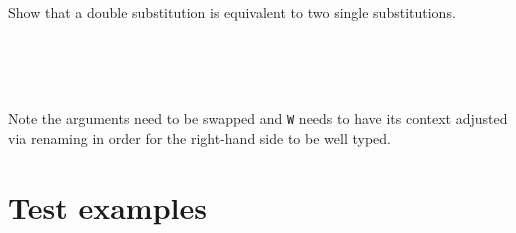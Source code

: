 Show that a double substitution is equivalent to two single
substitutions.

\begin{fence}
\begin{code}%
\>[0]\<%
\\
\>[0][@{}l@{\AgdaIndent{0}}]%
\>[2]\AgdaSpace{}%
\AgdaSymbol{:}\<%
\\
\>[2][@{}l@{\AgdaIndent{0}}]%
\>[4]%
\>[2326I]\AgdaSymbol{\{}\AgdaSpace{}%
\AgdaSpace{}%
\AgdaSpace{}%
\AgdaSymbol{\}}\AgdaSpace{}%
\AgdaSymbol{\{}\AgdaSpace{}%
\AgdaSymbol{:}\AgdaSpace{}%
\AgdaSpace{}%
\AgdaSpace{}%
\AgdaSymbol{\}}\AgdaSpace{}%
\AgdaSymbol{\{}\AgdaSpace{}%
\AgdaSymbol{:}\AgdaSpace{}%
\AgdaSpace{}%
\AgdaSpace{}%
\AgdaSymbol{\}}\AgdaSpace{}%
\AgdaSymbol{\{}\AgdaSpace{}%
\AgdaSymbol{:}\AgdaSpace{}%
\AgdaSpace{}%
\AgdaOperator{\AgdaInductiveConstructor{,}}\AgdaSpace{}%
\AgdaSpace{}%
\AgdaOperator{\AgdaInductiveConstructor{,}}\AgdaSpace{}%
\AgdaSpace{}%
\AgdaSpace{}%
\AgdaSymbol{\}}\AgdaSpace{}%
\<%
\\
\>[.][@{}l@{}]\<[2326I]%
\>[6]\AgdaSpace{}%
\AgdaOperator{\AgdaFunction{[}}\AgdaSpace{}%
\AgdaSpace{}%
\AgdaOperator{\AgdaFunction{][}}\AgdaSpace{}%
\AgdaSpace{}%
\AgdaOperator{\AgdaFunction{]}}\AgdaSpace{}%
\AgdaSpace{}%
\AgdaSymbol{(}\AgdaSpace{}%
\AgdaOperator{\AgdaFunction{[}}\AgdaSpace{}%
\AgdaSpace{}%
\AgdaSpace{}%
\AgdaSpace{}%
\AgdaOperator{\AgdaFunction{]}}\AgdaSymbol{)}\AgdaSpace{}%
\AgdaOperator{\AgdaFunction{[}}\AgdaSpace{}%
\AgdaSpace{}%
\AgdaOperator{\AgdaFunction{]}}\<%
\end{code}
\end{fence}

Note the arguments need to be swapped and \texttt{W} needs to have its
context adjusted via renaming in order for the right-hand side to be
well typed.

\hypertarget{test-examples}{%
\section{Test examples}\label{test-examples}}

